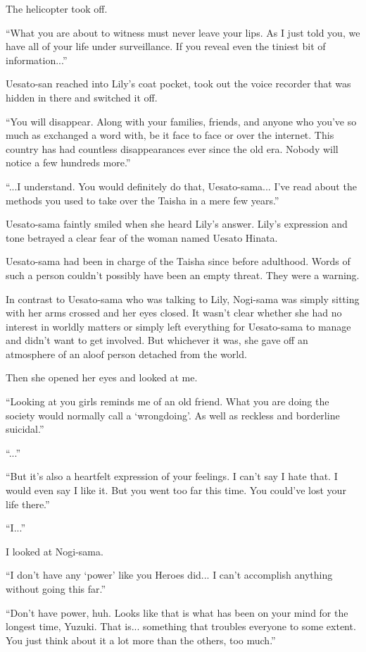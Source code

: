 The helicopter took off.

``What you are about to witness must never leave your lips. As I just told you, we have all of your life under surveillance. If you reveal even the tiniest bit of information...''

Uesato-san reached into Lily's coat pocket, took out the voice recorder that was hidden in there and switched it off.

``You will disappear. Along with your families, friends, and anyone who you've so much as exchanged a word with, be it face to face or over the internet. This country has had countless disappearances ever since the old era. Nobody will notice a few hundreds more.''

``...I understand. You would definitely do that, Uesato-sama... I've read about the methods you used to take over the Taisha in a mere few years.''

Uesato-sama faintly smiled when she heard Lily's answer. Lily's expression and tone betrayed a clear fear of the woman named Uesato Hinata.

Uesato-sama had been in charge of the Taisha since before adulthood. Words of such a person couldn't possibly have been an empty threat. They were a warning.

In contrast to Uesato-sama who was talking to Lily, Nogi-sama was simply sitting with her arms crossed and her eyes closed. It wasn't clear whether she had no interest in worldly matters or simply left everything for Uesato-sama to manage and didn't want to get involved. But whichever it was, she gave off an atmosphere of an aloof person detached from the world.

Then she opened her eyes and looked at me.

``Looking at you girls reminds me of an old friend. What you are doing the society would normally call a `wrongdoing'. As well as reckless and borderline suicidal.''

``...''

``But it's also a heartfelt expression of your feelings. I can't say I hate that. I would even say I like it. But you went too far this time. You could've lost your life there.''

``I...''

I looked at Nogi-sama.

``I don't have any `power' like you Heroes did... I can't accomplish anything without going this far.''

``Don't have power, huh. Looks like that is what has been on your mind for the longest time, Yuzuki. That is... something that troubles everyone to some extent. You just think about it a lot more than the others, too much.''

